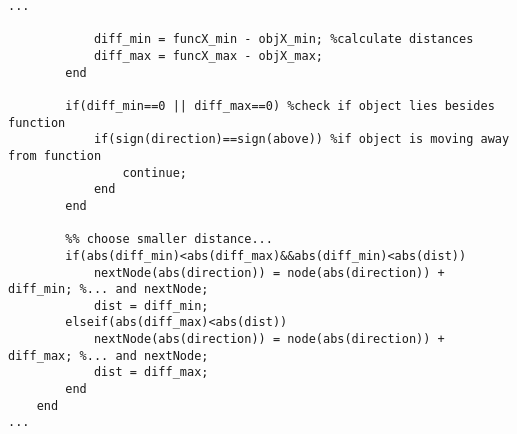 \begin{lstlisting}
...           
            
            diff_min = funcX_min - objX_min; %calculate distances
            diff_max = funcX_max - objX_max;
        end
        
        if(diff_min==0 || diff_max==0) %check if object lies besides function
            if(sign(direction)==sign(above)) %if object is moving away from function
                continue;
            end
        end
        
        %% choose smaller distance...
        if(abs(diff_min)<abs(diff_max)&&abs(diff_min)<abs(dist))
            nextNode(abs(direction)) = node(abs(direction)) + diff_min; %... and nextNode;
            dist = diff_min;
        elseif(abs(diff_max)<abs(dist))
            nextNode(abs(direction)) = node(abs(direction)) + diff_max; %... and nextNode;
            dist = diff_max;
        end
    end
...
\end{lstlisting}
